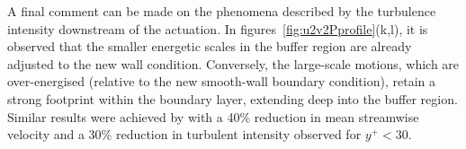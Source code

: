 A final comment can be made on the phenomena described by the turbulence intensity downstream of the actuation. In figures~\ref{fig:u2v2Pprofile}(k,l), it is observed that the smaller energetic scales in the buffer region are already adjusted to the new wall condition. Conversely, the large-scale motions, which are over-energised (relative to the new smooth-wall boundary condition), retain a strong footprint within the boundary layer, extending deep into the buffer region. Similar results were achieved by \citet{jukes2006TBLcontrol} with a 40\% reduction in mean streamwise velocity and a 30\% reduction in turbulent intensity observed for $y^+< 30$.

